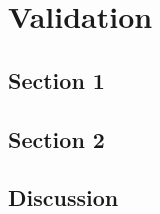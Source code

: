 

\chapter{Validation}
\label{chap:validation}

\lipsum[25]

\minitoc

\newpage

\section{Section 1}

\lipsum[26-27]

\section{Section 2}

\lipsum[28-29]

\section{Discussion}

\lipsum[30-31]